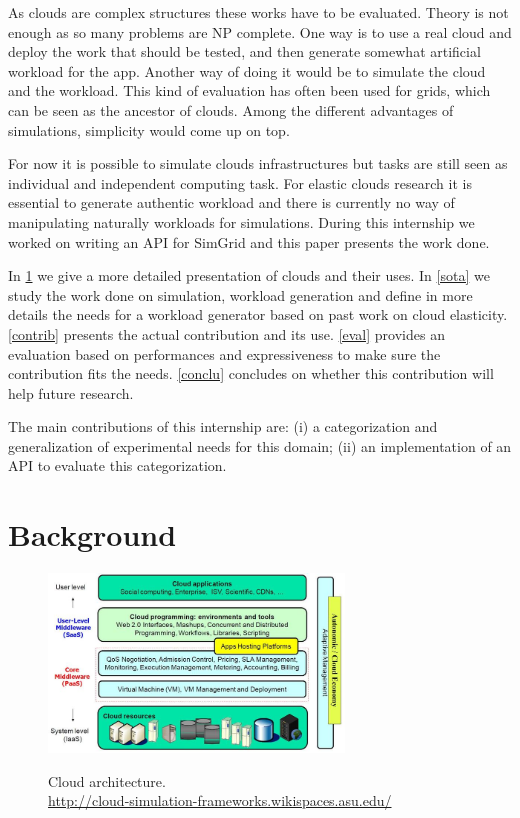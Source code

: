 \documentclass[a4paper, onecolumn, 11pt]{article}
\begin{document}
  As clouds are complex structures these works have to be evaluated. Theory is
  not enough as so many problems are NP complete. One way is to use a real cloud
  and deploy the work that should be tested, and then generate somewhat
  artificial workload for the app. Another way of doing it would be to simulate
  the cloud and the workload. This kind of evaluation has often been used for
  grids, which can be seen as the ancestor of clouds. Among the different
  advantages of simulations, simplicity would come up on top.
  
  For now it is possible to simulate clouds infrastructures but tasks are still
  seen as individual and independent computing task. For elastic clouds research
  it is essential to generate authentic workload and there is currently no way
  of manipulating naturally workloads for simulations. During this internship we
  worked on writing an API for SimGrid and this paper presents the work done.
  
  In \ref{background} we give a more detailed presentation of clouds and their 
  uses. In \ref{sota} we study the work done on simulation, workload generation 
  and define in more details the needs for a workload generator based on past 
  work on cloud elasticity. \ref{contrib} presents the actual contribution and 
  its use. \ref{eval} provides an evaluation based on performances and 
  expressiveness to make sure the contribution fits the needs. \ref{conclu} 
  concludes on whether this contribution will help future research.
  
  The main contributions of this internship are: (i) a categorization and
  generalization of experimental needs for this domain; (ii) an implementation
  of an API to evaluate this categorization.


\section{Background} \label{background}
  \begin{figure}
    \caption{Cloud architecture. \\ 
    \url{http://cloud-simulation-frameworks.wikispaces.asu.edu/}}
    \centering
    \includegraphics[width=0.7\textwidth]{../plots/cloud_architecture}
    \label{cloud_arch}
  \end{figure}
  
\end{document}
